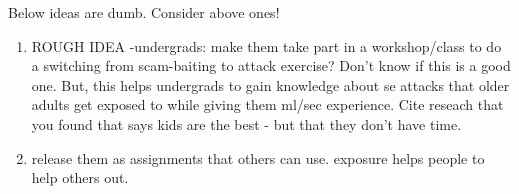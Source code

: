 Below ideas are dumb. Consider above ones!

\begin{enumerate}
    \item ROUGH IDEA -undergrads: make them take part in a workshop/class to do a switching from scam-baiting to attack exercise? Don't know if this is a good one. But, this helps undergrads to gain knowledge about se attacks that older adults get exposed to while giving them ml/sec experience.  Cite reseach that you found that says kids are the best - but that they don't have time.
    \item release them as assignments that others can use. exposure helps people to help others out.
\end{enumerate}